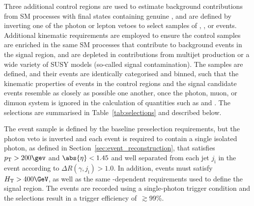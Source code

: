 Three additional control regions are used to estimate background
contributions from SM processes with final states containing genuine
\ptvecmiss, and are defined by inverting one of the photon or lepton
vetoes to select samples of \gj, \mj, or \mmj events. Additional
kinematic requirements are employed to ensure the control samples are
enriched in the same SM processes that contribute to background events
in the signal region, and are depleted in contributions from multijet
production or a wide variety of SUSY models (\ie so-called signal
contamination).  The samples are defined, and their events are
identically categorised and binned, such that the kinematic properties
of events in the control regions and the signal candidate events
resemble as closely as possible one another, once the photon, muon, or
dimuon system is ignored in the calculation of quantities such as
\scalht and \HTmiss. The selections are summarised in
Table~\ref{tab:selections} and described below.

The \gj event sample is defined by the baseline preselection
requirements, but the photon veto is inverted and each event is
required to contain a single isolated photon, as defined in
Section~\ref{sec:event_reconstruction}, that satisfies $\Pt > 200\gev$
and $\abs{\eta} < 1.45$ and well separated from each jet
$j_{\text{i}}$ in the event according to $\Delta
R(\gamma,j_{\text{i}}) > 1.0$. In addition, events must satisfy
$\scalht > 400\GeV$, as well as the same \scalht-dependent \alphat
requirements used to define the signal region. The events are recorded
using a single-photon trigger condition and the selections result in a
trigger efficiency of~$\gtrsim$99\%.

